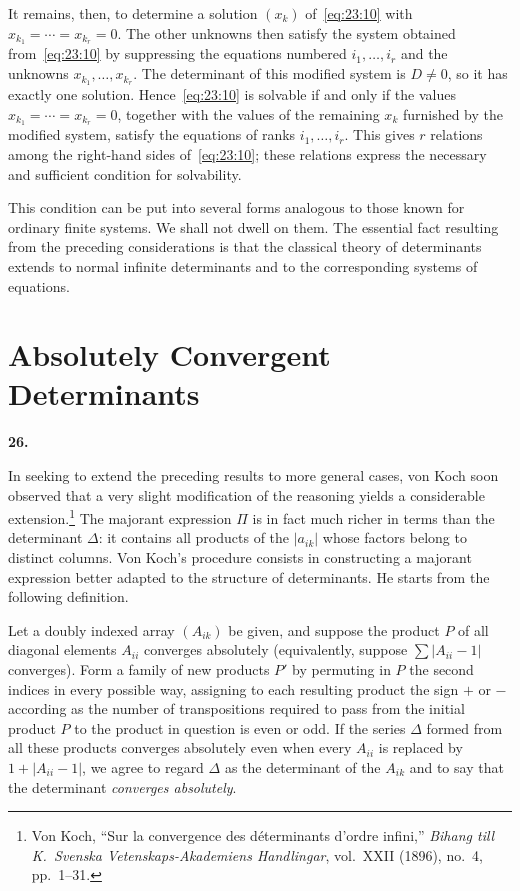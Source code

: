 \documentclass[
  paper=b5,
  fontsize=13pt,
  twoside=true,
  open=any,
  bookmarkpackage=false,
  chapterprefix=true,
  headings=normal
]{scrbook}
\theoremstyle{definition}
\newcommand{\numberedparagraph}[1]{%
  \par\medskip\phantomsection\label{sec:#1}%
  \noindent\textbf{#1.}\enspace
}
\begin{document}
It remains, then, to determine a solution $(x_k)$ of~\eqref{eq:23:10} with $x_{k_1}=\cdots=x_{k_r}=0$. The other unknowns then satisfy the system obtained from~\eqref{eq:23:10} by suppressing the equations numbered $i_1,\ldots,i_r$ and the unknowns $x_{k_1},\ldots,x_{k_r}$. The determinant of this modified system is $D\ne0$, so it has exactly one solution. Hence~\eqref{eq:23:10} is solvable if and only if the values $x_{k_1}=\cdots=x_{k_r}=0$, together with the values of the remaining $x_k$ furnished by the modified system, satisfy the equations of ranks $i_1,\ldots,i_r$. This gives $r$ relations among the right-hand sides of~\eqref{eq:23:10}; these relations express the necessary and sufficient condition for solvability.

This condition can be put into several forms analogous to
those known for ordinary finite systems. We shall not dwell on them. The essential fact resulting from the preceding considerations is that the classical theory of determinants extends to normal infinite determinants and to the corresponding systems of equations.

\section{Absolutely Convergent Determinants}

\numberedparagraph{26}
In seeking to extend the preceding results to more general cases, von Koch soon observed that a very slight modification of the reasoning yields a considerable extension.\footnote{Von Koch, ``Sur la convergence des d\'eterminants d'ordre infini,'' \emph{Bihang till K.~Svenska Vetenskaps-Akademiens Handlingar}, vol.~XXII (1896), no.~4, pp.~1--31.} The majorant expression $\Pi$ is in fact much richer in terms than the determinant $\Delta$: it contains all products of the $|a_{ik}|$ whose factors belong to distinct columns. Von Koch's procedure consists in constructing a majorant expression better adapted to the structure of determinants. He starts from the following definition.

Let a doubly indexed array $(A_{ik})$ be given, and suppose the product $P$ of all diagonal elements $A_{ii}$ converges absolutely (equivalently, suppose $\sum|A_{ii}-1|$ converges). Form a family of new products $P'$ by permuting in $P$ the second indices in every possible way, assigning to each resulting product the sign $+$ or $-$ according as the number of transpositions required to pass from the initial product $P$ to the product in question is even or odd. If the series $\Delta$ formed from all these products converges absolutely even when every $A_{ii}$ is replaced by $1+|A_{ii}-1|$, we agree to regard $\Delta$ as the determinant of the $A_{ik}$ and to say that the determinant \emph{converges absolutely}.
\end{document}
